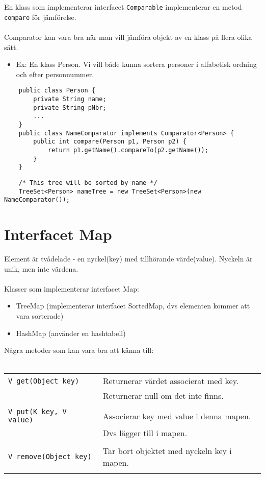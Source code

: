 \documentclass[11pt]{article}
\begin{document}
En klass som implementerar interfacet \verb+Comparable+ implementerar en metod \verb+compare+ för jämförelse. \\ \\
Comparator kan vara bra när man vill jämföra objekt av en klass på flera olika sätt. 
\begin{itemize}
\item{Ex: En klass Person. Vi vill både kunna sortera personer i alfabetisk ordning och efter personnummer.}
\end{itemize}
\begin{lstlisting}
	public class Person {
		private String name;
		private String pNbr;
		...
	}
	public class NameComparator implements Comparator<Person> {
		public int compare(Person p1, Person p2) {
			return p1.getName().compareTo(p2.getName());
		}
	}
\end{lstlisting}
\begin{lstlisting}
	/* This tree will be sorted by name */
	TreeSet<Person> nameTree = new TreeSet<Person>(new NameComparator());
\end{lstlisting}
\section{Interfacet Map}
Element är tvådelade - en nyckel(key) med tillhörande värde(value). Nyckeln är unik, men inte värdena. \\ \\
Klasser som implementerar interfacet Map: 
\begin{itemize}
\item{TreeMap (implementerar interfacet SortedMap, dvs elementen kommer att vara sorterade)}
\item{HashMap (använder en hashtabell)}
\end{itemize}
Några metoder som kan vara bra att känna till:\\ \\
\begin{tabular}{l|l}
\hline
	\verb+V get(Object key)+	&	Returnerar värdet associerat med key. \\ 
	&	Returnerar null om det inte finns. \\ \\
	\verb+V put(K key, V value)+	&	Associerar key med value i denna mapen. \\
	&	Dvs lägger till i mapen. \\ \\
	\verb+V remove(Object key)+	&	Tar bort objektet med nyckeln key i mapen. \\ \\
\hline	
\end{tabular}
\end{document}
